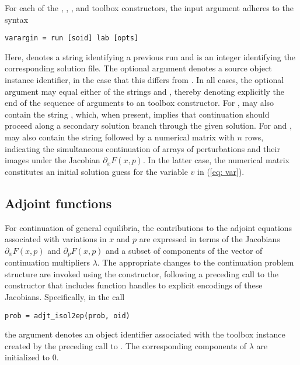 For each of the , , , and  toolbox constructors, the  input argument adheres to the syntax
\begin{lstlisting}[language=coco-highlight]
varargin = run [soid] lab [opts]
\end{lstlisting}
Here,  denotes a string identifying a previous run and  is an integer identifying the corresponding solution file. The optional argument  denotes a source object instance identifier, in the case that this differs from . In all cases, the optional  argument may equal either of the strings  and , thereby denoting explicitly the end of the sequence of arguments to an  toolbox constructor. For ,  may also contain the string , which, when present, implies that continuation should proceed along a secondary solution branch through the given solution. For  and ,  may also contain the string  followed by a numerical matrix with $n$ rows, indicating the simultaneous continuation of arrays of perturbations and their images under the Jacobian $\partial_x F(x,p)$. In the latter case, the numerical matrix constitutes an initial solution guess for the variable $v$ in (\ref{eq: var}).

\subsection{Adjoint functions}
For continuation of general equilibria, the contributions to the adjoint equations associated with variations in $x$ and $p$ are expressed in terms of the Jacobians $\partial_x F(x,p)$ and $\partial_p F(x,p)$ and a subset of components of the vector of continuation multipliers $\lambda$. The appropriate changes to the continuation problem structure are invoked using the  constructor, following a preceding call to the  constructor that includes function handles to explicit encodings of these Jacobians.  Specifically, in the call
\begin{lstlisting}[language=coco-highlight]
prob = adjt_isol2ep(prob, oid)
\end{lstlisting}
the  argument denotes an object identifier associated with the toolbox instance created by the preceding call to . The corresponding components of $\lambda$ are initialized to $0$.

